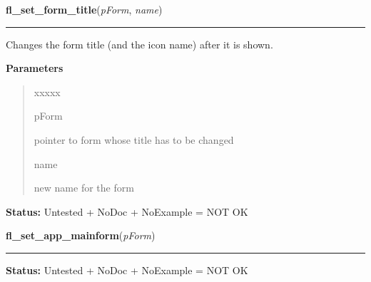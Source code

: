 \hspace{.8\funcindent}\begin{boxedminipage}{\funcwidth}

    \raggedright \textbf{fl\_set\_form\_title}(\textit{pForm}, \textit{name})

    \vspace{-1.5ex}

    \rule{\textwidth}{0.5\fboxrule}
\setlength{\parskip}{2ex}
    Changes the form title (and the icon name) after it is shown.

\setlength{\parskip}{1ex}
      \textbf{Parameters}
      \vspace{-1ex}

      \begin{quote}
        \begin{Ventry}{xxxxx}

          \item[pForm]

          pointer to form whose title has to be changed

          \item[name]

          new name for the form

        \end{Ventry}

      \end{quote}

\textbf{Status:} Untested + NoDoc + NoExample = NOT OK



    \end{boxedminipage}

    \label{xformslib:library:fl_set_app_mainform}

    \vspace{0.5ex}

\hspace{.8\funcindent}\begin{boxedminipage}{\funcwidth}

    \raggedright \textbf{fl\_set\_app\_mainform}(\textit{pForm})

    \vspace{-1.5ex}

    \rule{\textwidth}{0.5\fboxrule}
\setlength{\parskip}{2ex}
\setlength{\parskip}{1ex}
\textbf{Status:} Untested + NoDoc + NoExample = NOT OK



    \end{boxedminipage}

